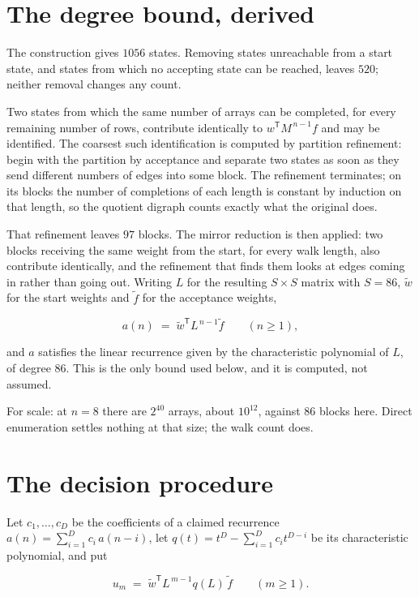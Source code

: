 \documentclass[11pt]{article}
\theoremstyle{definition}
\begin{document}
\section{The degree bound, derived}

The construction gives $1056$ states. Removing states unreachable from a start state, and states from which no accepting state can be reached, leaves $520$; neither removal changes any count.

Two states from which the same number of arrays can be completed, for every remaining number of rows, contribute identically to $w^{\mathsf T}M^{\,n-1}f$ and may be identified. The coarsest such identification is computed by partition refinement: begin with the partition by acceptance and separate two states as soon as they send different numbers of edges into some block. The refinement terminates; on its blocks the number of completions of each length is constant by induction on that length, so the quotient digraph counts exactly what the original does.

That refinement leaves $97$ blocks. The mirror reduction is then applied: two blocks receiving the same weight from the start, for every walk length, also contribute identically, and the refinement that finds them looks at edges coming in rather than going out. Writing $L$ for the resulting $S \times S$ matrix with $S = 86$, $\tilde w$ for the start weights and $\tilde f$ for the acceptance weights,

\[a(n) \;=\; \tilde w^{\mathsf T} L^{\,n-1} \tilde f \qquad (n \ge 1),\]

and $a$ satisfies the linear recurrence given by the characteristic polynomial of $L$, of degree $86$. This is the only bound used below, and it is computed, not assumed.

For scale: at $n = 8$ there are $2^{40}$ arrays, about $10^{12}$, against $86$ blocks here. Direct enumeration settles nothing at that size; the walk count does.

\section{The decision procedure}

Let $c_1,\dots,c_D$ be the coefficients of a claimed recurrence $a(n) = \sum_{i=1}^{D} c_i\,a(n-i)$, let $q(t) = t^{D} - \sum_{i=1}^{D} c_i t^{D-i}$ be its characteristic polynomial, and put

\[u_m \;=\; \tilde w^{\mathsf T} L^{\,m-1} q(L)\,\tilde f \qquad (m \ge 1).\]
\end{document}

